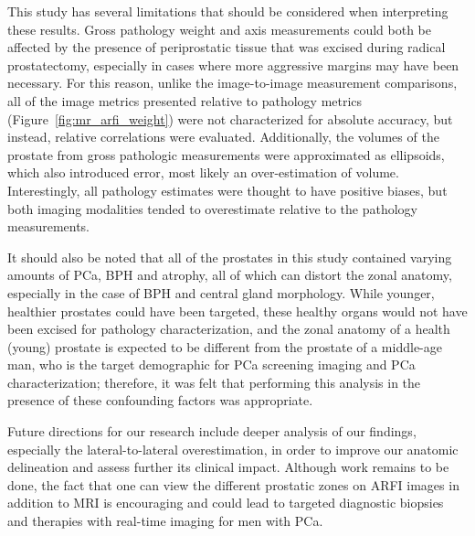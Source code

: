 This study has several limitations that should be considered when interpreting
these results.  Gross pathology weight and axis measurements could both be
affected by the presence of periprostatic tissue that was excised during
radical prostatectomy, especially in cases where more aggressive margins may
have been necessary.  For this reason, unlike the image-to-image measurement
comparisons, all of the image metrics presented relative to pathology metrics
(Figure~\ref{fig:mr_arfi_weight}) were not characterized for absolute accuracy,
but instead, relative correlations were evaluated.  Additionally, the volumes
of the prostate from gross pathologic measurements were approximated as
ellipsoids, which also introduced error, most likely an over-estimation of
volume.  Interestingly, all pathology estimates were thought to have positive
biases, but both imaging modalities tended to overestimate relative to the
pathology measurements.

It should also be noted that all of the prostates in this study contained
varying amounts of PCa, BPH and atrophy, all of which can distort the zonal
anatomy, especially in the case of BPH and central gland morphology.  While
younger, healthier prostates could have been targeted, these healthy organs
would not have been excised for pathology characterization, and the zonal
anatomy of a health (young) prostate is expected to be different from the
prostate of a middle-age man, who is the target demographic for PCa screening
imaging and PCa characterization; therefore, it was felt that performing this
analysis in the presence of these confounding factors was appropriate.

Future directions for our research include deeper analysis of our findings,
especially the lateral-to-lateral overestimation, in order to improve our
anatomic delineation and assess further its clinical impact. Although work
remains to be done, the fact that one can view the different prostatic zones on
ARFI images in addition to MRI is encouraging and could lead to targeted
diagnostic biopsies and therapies with real-time imaging for men with PCa. 
